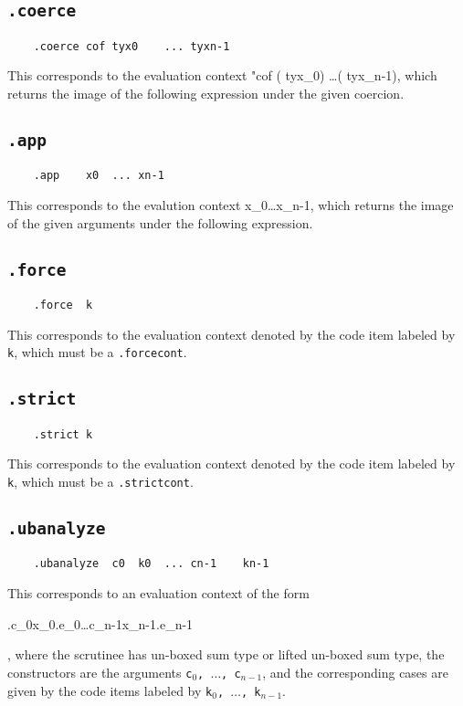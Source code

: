 \documentclass{report}
\newcommand\stringcode[1]{\texttt{#1}}
\begin{document}
\subsection{\stringcode{.coerce}}

\begin{verbatim}
	.coerce	cof	tyx0	...	tyxn-1
\end{verbatim}
This corresponds to the evaluation context \<\bullet\;"\!\rhd\;cof ( tyx_0) \ldots ( tyx_{n-1})\>,
which returns the image of the following expression under the given coercion.

\subsection{\stringcode{.app}}

\begin{verbatim}
	.app	x0	...	xn-1
\end{verbatim}
This corresponds to the evalution context \<\bullet\;x_0\;\ldots\;x_n{-1}\>,
which returns the image of the given arguments under the following expression.

\subsection{\stringcode{.force}}

\begin{verbatim}
	.force	k
\end{verbatim}
This corresponds to the evaluation context denoted by the code item labeled by \stringcode{k},
which must be a \stringcode{.forcecont}.

\subsection{\stringcode{.strict}}

\begin{verbatim}
	.strict	k
\end{verbatim}
This corresponds to the evaluation context denoted by the code item labeled by \stringcode{k},
which must be a \stringcode{.strictcont}.

\subsection{\stringcode{.ubanalyze}}

\begin{verbatim}
	.ubanalyze	c0	k0	...	cn-1	kn-1
\end{verbatim}
This corresponds to an evaluation context of the form
\begin{haskell}
\;\bullet.\;\;c_0\;x_0.\;e_0\ldots{}\;c_{n-1}\;x_{n-1}.\;e_{n-1}
\end{haskell},
where the scrutinee has un-boxed sum type or lifted un-boxed sum type,
the constructors are the arguments \stringcode{c$_0$, $\ldots$, c$_{n-1}$},
and the corresponding cases are given by the code items labeled by \stringcode{k$_0$, $\ldots$, k$_{n-1}$}.
\end{document}
